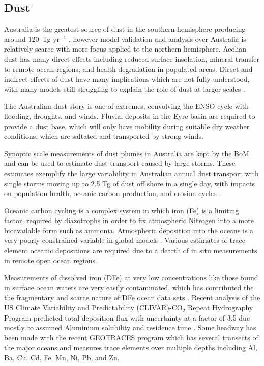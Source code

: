 \subsection{Dust}

Australia is the greatest source of dust in the southern hemisphere producing around 120~Tg yr$^{-1}$ \cite{Li_2008}, however model validation and analysis over Australia is relatively scarce with more focus applied to the northern hemisphere.
Aeolian dust has many direct effects including reduced surface insolation, mineral transfer to remote ocean regions, and health degradation in populated areas.
Direct and indirect effects of dust have many implications which are not fully understood, with many models still struggling to explain the role of dust at larger scales \cite{Rotstayn_2011}.

The Australian dust story is one of extremes, convolving the ENSO cycle with flooding, droughts, and winds.
Fluvial deposits in the Eyre basin are required to provide a dust base, which will only have mobility during suitable dry weather conditions, which are saltated and transported by strong winds\cite{Zender_2003}.

Synoptic scale measurements of dust plumes in Australia are kept by the BoM and can be used to estimate dust transport caused by large storms. 
These estimates exemplify the large variability in Australian annual dust transport with single storms moving up to 2.5 Tg of dust off shore in a single day, with impacts on population health, oceanic carbon production, and erosion cycles \cite{Leys_2011,Shao_2007}.

Oceanic carbon cycling is a complex system in which iron (Fe) is a limiting factor, required by diazotrophs in order to fix atmospheric Nitrogen into a more bioavailable form such as ammonia.
Atmospheric deposition into the oceans is a very poorly constrained variable in global models \cite{Grand_2015}.
Various estimates of trace element oceanic depositions are required due to a dearth of in situ measurements in remote open ocean regions.

Measurements of dissolved iron (DFe) at very low concentrations like those found in surface ocean waters are very easily contaminated, which has contributed the the fragmentary and scarce nature of DFe ocean data sets \cite{Rijkenberg_2014}.
Recent analysis of the US Climate Variability and Predictability (CLIVAR)-CO$_{2}$ Repeat Hydrography Program predicted total deposition flux with uncertainty at a factor of 3.5 due mostly to assumed Aluminium solubility and residence time \cite{Grand_2015}.
Some headway has been made with the recent GEOTRACES program which has several transects of the major oceans and measures trace elements over multiple depths including Al, Ba, Cu, Cd, Fe, Mn, Ni, Pb, and Zn.
  
